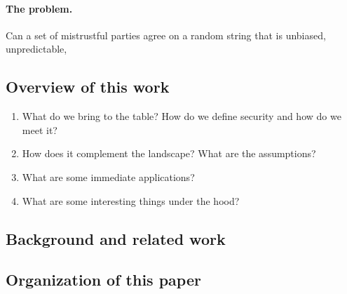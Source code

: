 







\paragraph{The problem.} 
Can a set of mistrustful parties agree on a random string that is unbiased, unpredictable, 

\subsection{Overview of this work}
\begin{enumerate}
    \item What do we bring to the table? How do we define security and how do we meet it?
    \item How does it complement the landscape? What are the assumptions?
    \item What are some immediate applications?
    \item What are some interesting things under the hood?
\end{enumerate}

\subsection{Background and related work}
\label{sec:related-work}


\subsection{Organization of this paper}